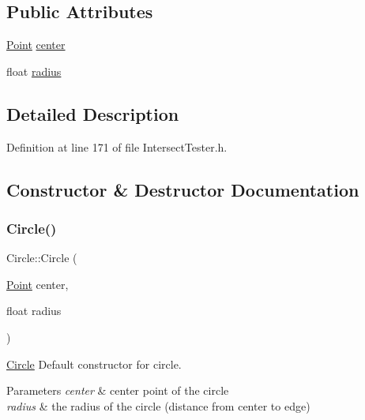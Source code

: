 \subsection*{Public Attributes}
\begin{DoxyCompactItemize}
\item 
\hyperlink{class_point}{Point} \hyperlink{class_circle_a8c4026a5a34d2df1527f019dd456317b}{center}
\item 
float \hyperlink{class_circle_a47644132ec8bec0f3a4e8d0e15bcd5d3}{radius}
\end{DoxyCompactItemize}


\subsection{Detailed Description}


Definition at line 171 of file Intersect\+Tester.\+h.



\subsection{Constructor \& Destructor Documentation}
\mbox{\label{class_circle_a7a761c34c5a913be8bc0b05ea0dc327c}} 
\subsubsection{\texorpdfstring{Circle()}{Circle()}}
{\footnotesize\ttfamily Circle\+::\+Circle (\begin{DoxyParamCaption}\item[{\hyperlink{class_point}{Point}}]{center,  }\item[{float}]{radius }\end{DoxyParamCaption})\hspace{0.3cm}{\ttfamily [inline]}}



\hyperlink{class_circle}{Circle} Default constructor for circle. 


\begin{DoxyParams}{Parameters}
{\em center} & center point of the circle \\
\hline
{\em radius} & the radius of the circle (distance from center to edge) \\
\hline
\end{DoxyParams}


